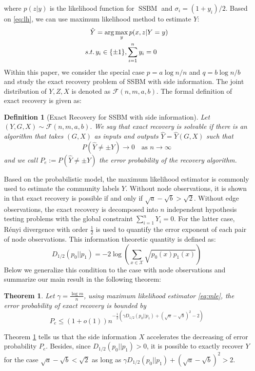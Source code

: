 \documentclass[conference]{IEEEtran}
\newtheorem{definition}{Definition}
\newtheorem{theorem}{Theorem}
\DeclareMathOperator{\SSBM}{SSBM}
\begin{document}
	where $p(z|y)$ is the likelihood function for $\SSBM$ and $\sigma_i = (1+y_i)/2$.
	Based on \eqref{eq:lh}, we can use maximum likelihood method to estimate
	$Y$:
	\begin{align}
	\hat{Y} &= \arg\max_y p(x,z|Y=y) \notag \\
	s.t.\, & y_i \in \{\pm 1\}, \sum_{i=1}^n y_i=0 \label{eq:mle}
	\end{align}
	Within this paper, we consider the special case $p = a \log n /n$ and $q = b \log n / b$ and study
	the exact recovery problem of SSBM with side information. The joint distribution
	of $Y,Z, X$ is denoted as $\mathcal{F}(n,m,a,b)$.
	The formal definition of exact
	recovery is given as:
	\begin{definition}[Exact Recovery for SSBM with side information]
		Let $(Y,G,X) \sim \mathcal{F}(n,m,a,b)$.
		We say that exact recovery is solvable if there is an algorithm that takes $(G,X)$ as inputs and outputs $\hat{Y}=\hat{Y}(G,X)$ such that
		$$
		P(\hat{Y} \neq \pm Y) \to 0
		\text{~~~as~} n\to\infty
		$$
		and we call $P_e:=P(\hat{Y} \neq \pm Y)$ the error probability of the recovery algorithm.
	\end{definition}
	Based on the probabilistic model, the maximum likelihood estimator
	is commonly used to estimate the community labels $Y$.
	Without node observations, it is shown in \cite{abbe2015exact}
	that exact recovery is possible if and only if $\sqrt{a} - \sqrt{b} > \sqrt{2}$.
	Without edge observations, the exact recovery is decomposed into $n$
	independent hypothesis testing problems with the global constraint $\sum_{i=1}^n Y_i=0$. For the latter case, Rényi divergence with order $\frac{1}{2}$
	is used to quantify the error exponent of each pair of node observations.
	This information theoretic quantity is defined as:
	\begin{equation}
	D_{1/2}(p_0 || p_1) = -2\log(\sum_{x \in \mathcal{X}} \sqrt{p_0(x)p_1(x)} )
	\end{equation}
	Below we generalize this condition to the case with node observations and summarize
	our main result in the following theorem:
	\begin{theorem}\label{thm:Pe}
		Let $\gamma = \frac{\log m}{n}$, using maximum likelihood estimator \eqref{eq:mle}, the error probability
		of exact recovery is bounded by
		\begin{equation}\label{eq:PeMain}
		P_e \leq (1+o(1)) n^{-\frac{1}{2}\left(\gamma D_{1/2}(p_0||p_1) + (\sqrt{a} - \sqrt{b})^2-2\right)}
		\end{equation}
	\end{theorem}
	Theorem \ref{thm:Pe} tells us that the side information $X$ accelerates the
	decreasing of error probability $P_e$. Besides, since 
	$D_{1/2}(p_0||p_1) > 0$, it is possible to exactly recover $Y$
	for the case $\sqrt{a} - \sqrt{b} < \sqrt{2}$ as long as $\gamma D_{1/2}(p_0||p_1) + (\sqrt{a} - \sqrt{b})^2 > 2$.
	
\end{document}
